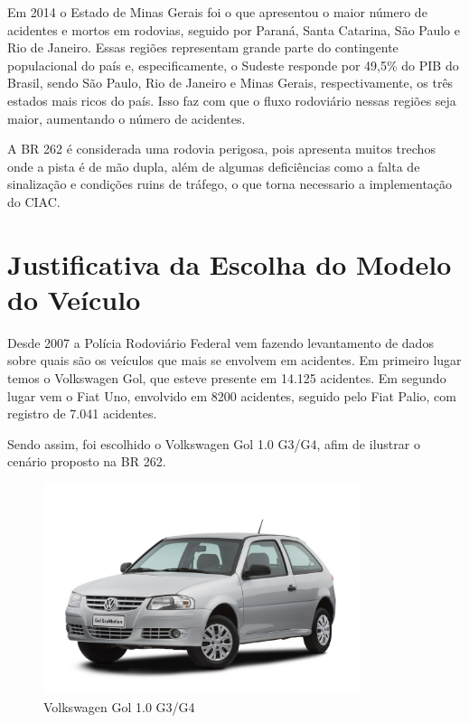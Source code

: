 Em 2014 o Estado de Minas Gerais foi o que apresentou o maior número de acidentes e mortos em rodovias, seguido por Paraná, Santa Catarina, São Paulo e Rio de Janeiro. Essas regiões representam grande parte do contingente populacional do país e, especificamente, o Sudeste responde por 49,5\% do PIB do Brasil, sendo São Paulo, Rio de Janeiro e Minas Gerais, respectivamente, os três estados mais ricos do país. Isso faz com que o fluxo rodoviário nessas regiões seja maior, aumentando o número de acidentes. 

A BR 262 é considerada uma rodovia perigosa, pois apresenta muitos trechos onde a pista é de mão dupla, além de algumas deficiências como a falta de sinalização e condições ruins de tráfego, o que torna necessario a implementação do CIAC. 

\section{Justificativa da Escolha do Modelo do Veículo}

Desde 2007 a Polícia Rodoviário Federal vem fazendo levantamento de dados sobre quais são os veículos que mais se envolvem em acidentes. Em primeiro lugar temos o Volkswagen Gol, que esteve presente em 14.125 acidentes. Em segundo lugar vem o Fiat Uno, envolvido em 8200 acidentes, seguido pelo Fiat Palio, com registro de 7.041 acidentes. 

Sendo assim, foi escolhido o  Volkswagen Gol 1.0 G3/G4, afim de ilustrar o cenário proposto na BR 262.

\begin{figure}[h]
  \centering
  \includegraphics[width=350px, scale=1]{figuras/gol}
  \caption{Volkswagen Gol 1.0 G3/G4}
\label{fig:gol}
\end{figure}





























